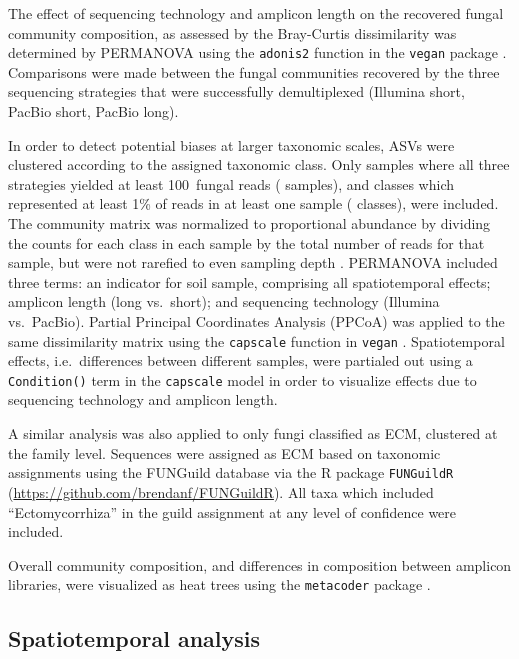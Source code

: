 \documentclass[
]{article}
\begin{document}
The effect of sequencing technology and amplicon length on the recovered fungal community
composition, as assessed by the Bray-Curtis dissimilarity was determined by PERMANOVA \autocite{anderson2003} using the \texttt{adonis2} function in the \texttt{vegan} package \autocite{R-vegan}.
Comparisons were made between the fungal communities recovered by the three sequencing strategies that were successfully demultiplexed (Illumina short, PacBio short, PacBio long).

In order to detect potential biases at larger taxonomic scales, ASVs were clustered according to the assigned taxonomic class.
Only samples where all three strategies yielded at least 100~fungal reads ( samples), and classes which represented at least 1\% of reads in at least one sample ( classes), were included.
The community matrix was normalized to proportional abundance by dividing the counts for each class in each sample by the total number of reads for that sample, but were not rarefied to even sampling depth \autocite{mcmurdie2014}.
PERMANOVA included three terms: an indicator for soil sample, comprising all spatiotemporal effects; amplicon length (long vs.~short); and sequencing technology (Illumina vs.~PacBio).
Partial Principal Coordinates Analysis (PPCoA) was applied to the same dissimilarity matrix using the \texttt{capscale} function in \texttt{vegan} \autocite{R-vegan}.
Spatiotemporal effects, i.e.~differences between different samples, were partialed out using a \texttt{Condition()} term in the \texttt{capscale} model in order to visualize effects due to sequencing technology and amplicon length.

A similar analysis was also applied to only fungi classified as ECM, clustered at the family level.
Sequences were assigned as ECM based on taxonomic assignments using the FUNGuild database \autocite{nguyen2016funguild} via the R package \texttt{FUNGuildR} (\url{https://github.com/brendanf/FUNGuildR}).
All taxa which included ``Ectomycorrhiza'' in the guild assignment at any level of confidence were included.

Overall community composition, and differences in composition between amplicon libraries, were visualized as heat trees using the \texttt{metacoder} package \autocite{R-metacoder}.

\hypertarget{spatiotemporal-supplement}{%
\subsection{Spatiotemporal analysis}\label{spatiotemporal-supplement}}
\end{document}
